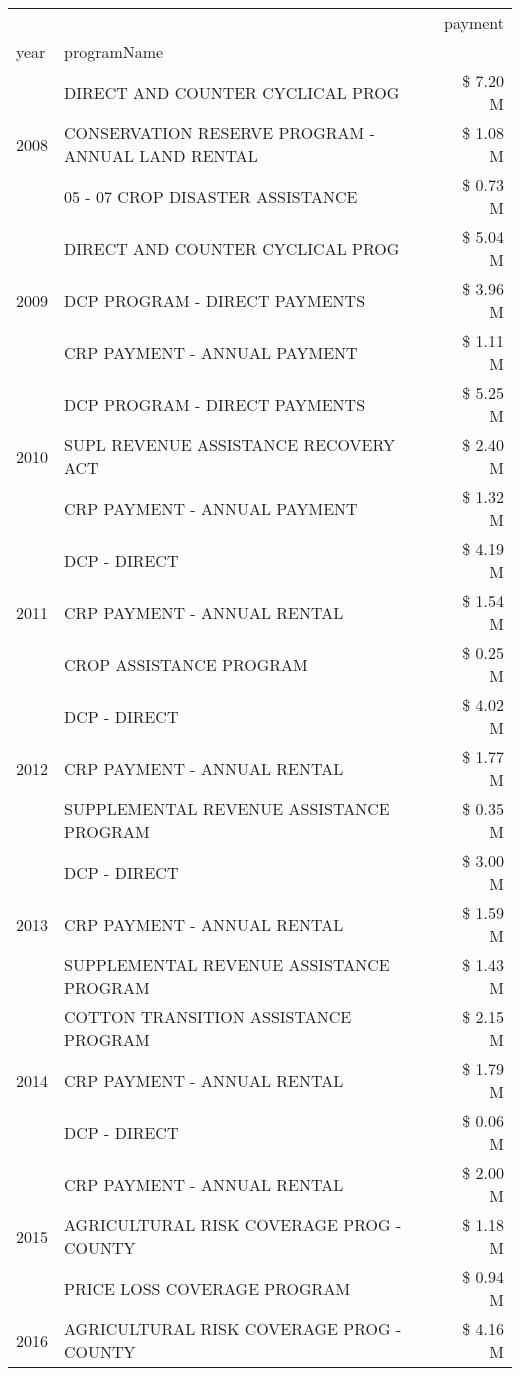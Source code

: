 \begin{tabular}{llr}
\toprule
 &  & payment \\
year & programName &  \\
\midrule
\multirow[t]{3}{*}{2008} & DIRECT AND COUNTER CYCLICAL PROG & \$ 7.20 M \\
 & CONSERVATION RESERVE PROGRAM - ANNUAL LAND RENTAL & \$ 1.08 M \\
 & 05 - 07 CROP DISASTER ASSISTANCE & \$ 0.73 M \\
\cline{1-3}
\multirow[t]{3}{*}{2009} & DIRECT AND COUNTER CYCLICAL PROG & \$ 5.04 M \\
 & DCP PROGRAM - DIRECT PAYMENTS & \$ 3.96 M \\
 & CRP PAYMENT - ANNUAL PAYMENT & \$ 1.11 M \\
\cline{1-3}
\multirow[t]{3}{*}{2010} & DCP PROGRAM - DIRECT PAYMENTS & \$ 5.25 M \\
 & SUPL REVENUE ASSISTANCE RECOVERY ACT & \$ 2.40 M \\
 & CRP PAYMENT - ANNUAL PAYMENT & \$ 1.32 M \\
\cline{1-3}
\multirow[t]{3}{*}{2011} & DCP - DIRECT & \$ 4.19 M \\
 & CRP PAYMENT - ANNUAL RENTAL & \$ 1.54 M \\
 & CROP ASSISTANCE PROGRAM & \$ 0.25 M \\
\cline{1-3}
\multirow[t]{3}{*}{2012} & DCP - DIRECT & \$ 4.02 M \\
 & CRP PAYMENT - ANNUAL RENTAL & \$ 1.77 M \\
 & SUPPLEMENTAL REVENUE ASSISTANCE PROGRAM & \$ 0.35 M \\
\cline{1-3}
\multirow[t]{3}{*}{2013} & DCP - DIRECT & \$ 3.00 M \\
 & CRP PAYMENT - ANNUAL RENTAL & \$ 1.59 M \\
 & SUPPLEMENTAL REVENUE ASSISTANCE PROGRAM & \$ 1.43 M \\
\cline{1-3}
\multirow[t]{3}{*}{2014} & COTTON TRANSITION ASSISTANCE PROGRAM & \$ 2.15 M \\
 & CRP PAYMENT - ANNUAL RENTAL & \$ 1.79 M \\
 & DCP - DIRECT & \$ 0.06 M \\
\cline{1-3}
\multirow[t]{3}{*}{2015} & CRP PAYMENT - ANNUAL RENTAL & \$ 2.00 M \\
 & AGRICULTURAL RISK COVERAGE PROG - COUNTY & \$ 1.18 M \\
 & PRICE LOSS COVERAGE PROGRAM & \$ 0.94 M \\
\cline{1-3}
\multirow[t]{3}{*}{2016} & AGRICULTURAL RISK COVERAGE PROG - COUNTY & \$ 4.16 M \\

\end{tabular}
